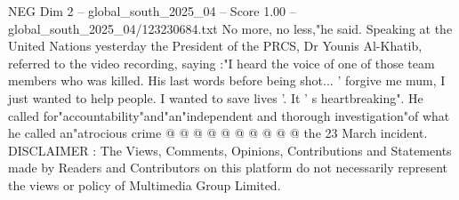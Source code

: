 \begin{textsample}{NEG Dim 2 – global\_south\_2025\_04 – Score 1.00 – global\_south\_2025\_04/123230684.txt}
No more, no less,"he said.
Speaking at the United Nations yesterday the President of the PRCS, Dr Younis Al-Khatib, referred to the video recording, saying :"I heard the voice of one of those team members who was killed.
His last words before being shot... ' forgive me mum, I just wanted to help people.
I wanted to save lives '.
It ' s heartbreaking".
He called for"accountability"and"an"independent and thorough investigation"of what he called an"atrocious crime @ @ @ @ @ @ @ @ @ @ the 23 March incident.
DISCLAIMER : The Views, Comments, Opinions, Contributions and Statements made by Readers and Contributors on this platform do not necessarily represent the views or policy of Multimedia Group Limited.

\end{textsample}
